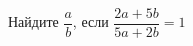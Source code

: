\begin{ex}
	\begin{condition}
		Найдите \( \dfrac{a}{b} \), если \( \dfrac{2a+5b}{5a+2b}=1 \)
	\end{condition}
\end{ex}